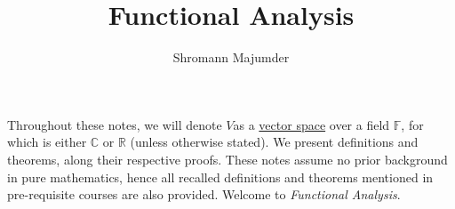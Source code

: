 \documentclass{article}
\title{Functional Analysis}
\author{Shromann Majumder}
\date{}
\newcommand{\R}{\mathbb{R}}
\newcommand{\C}{\mathbb{C}}
\newcommand{\F}{\mathbb{F}}
\newcommand{\V}{$V$}
\begin{document}
\maketitle
Throughout these notes, we will denote \V as a \hyperlink{https://en.wikipedia.org/wiki/Vector_space}{vector space} over a field $\F$, for which is either $\C$ or $\R$ (unless otherwise stated). We present definitions and theorems, along their respective proofs. These notes assume no prior background in pure mathematics, hence all recalled definitions and theorems mentioned in pre-requisite courses are also provided. Welcome to \emph{Functional Analysis}. 
\tableofcontents
\newpage








\end{document}
